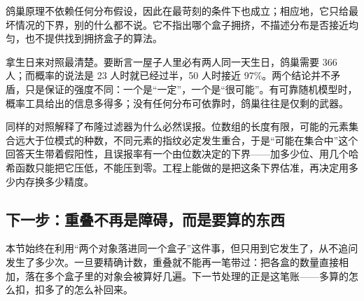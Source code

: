 鸽巢原理不依赖任何分布假设，因此在最苛刻的条件下也成立；相应地，它只给最坏情况的下界，别的什么都不说。它不指出哪个盒子拥挤，不描述分布是否接近均匀，也不提供找到拥挤盒子的算法。

拿生日来对照最清楚。要断言一屋子人里必有两人同一天生日，鸽巢需要 366 人；而概率的说法是 23 人时就已经过半，50 人时接近 \(97\%\)。两个结论并不矛盾，只是保证的强度不同：一个是``一定''，一个是``很可能''。有可靠随机模型时，概率工具给出的信息多得多；没有任何分布可依靠时，鸽巢往往是仅剩的武器。

同样的对照解释了布隆过滤器为什么必然误报。位数组的长度有限，可能的元素集合远大于位模式的种数，不同元素的指纹必定发生重合，于是``可能在集合中''这个回答天生带着假阳性，且误报率有一个由位数决定的下界——加多少位、用几个哈希函数只能把它压低，不能压到零。工程上能做的是把这条下界估准，再决定用多少内存换多少精度。

\subsection{下一步：重叠不再是障碍，而是要算的东西}

本节始终在利用``两个对象落进同一个盒子''这件事，但只用到它发生了，从不追问发生了多少次。一旦要精确计数，重叠就不能再一笔带过：把各盒的数量直接相加，落在多个盒子里的对象会被算好几遍。下一节处理的正是这笔账——多算的怎么扣，扣多了的怎么补回来。
